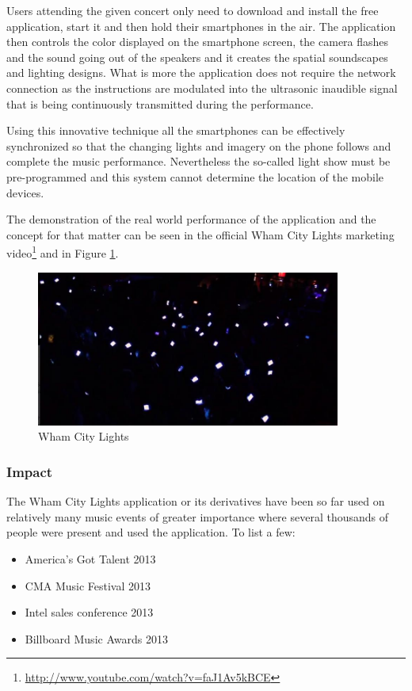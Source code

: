 Users attending the given concert only need to download and install the free application, start it and then hold their smartphones in the air.
The application then controls the color displayed on the smartphone screen, the camera flashes and the sound going out of the speakers and it creates the spatial soundscapes and lighting designs.
What is more the application does not require the network connection as the instructions are modulated into the ultrasonic inaudible signal that is being continuously transmitted during the performance.

Using this innovative technique all the smartphones can be effectively synchronized so that the  changing lights and imagery on the phone follows and complete the music performance.
Nevertheless the so-called light show must be pre-programmed and this system cannot determine the location of the mobile devices.

The demonstration of the real world performance of the application and the concept for that matter can be seen in the official Wham City Lights marketing video\footnote{\url{http://www.youtube.com/watch?v=faJ1Av5kBCE}} and in Figure \ref{fig:wham_city_lights}.

\begin{figure}[!ht]
	\centering
		\includegraphics[width=10cm]{preliminaryStudies/wham_city_lights.jpg}
	\caption{Wham City Lights}
	\label{fig:wham_city_lights}
\end{figure}

\subsubsection{Impact}
The Wham City Lights application or its derivatives have been so far used on relatively many music events of greater importance where several thousands of people were present and used the application. To list a few:
\begin{itemize}
\item America's Got Talent 2013
\item CMA Music Festival 2013
\item Intel sales conference 2013
\item Billboard Music Awards 2013
\end{itemize}

